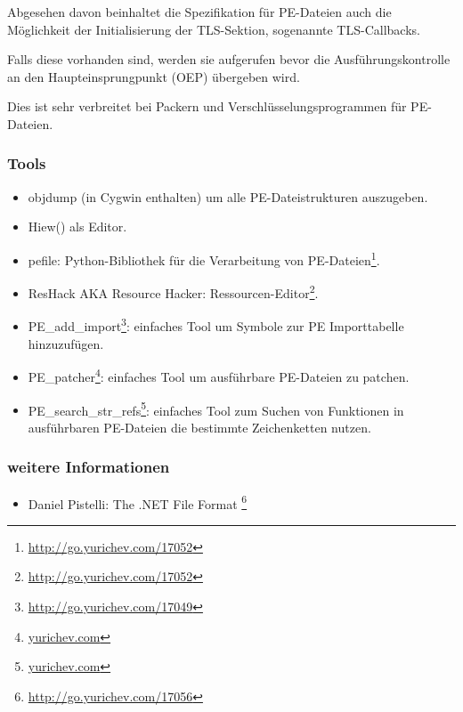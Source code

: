 Abgesehen davon beinhaltet die Spezifikation für PE-Dateien auch die Möglichkeit
der Initialisierung der \ac{TLS}-Sektion, sogenannte TLS-Callbacks.

Falls diese vorhanden sind, werden sie aufgerufen bevor die Ausführungskontrolle
an den Haupteinsprungpunkt (\ac{OEP}) übergeben wird.

Dies ist sehr verbreitet bei Packern und Verschlüsselungsprogrammen für PE-Dateien.

\subsubsection{Tools}

\label{ResHack}

\begin{itemize}
\item objdump (in Cygwin enthalten) um alle PE-Dateistrukturen auszugeben.

\item Hiew() als Editor.

\item pefile: Python-Bibliothek für die Verarbeitung von PE-Dateien\footnote{\url{http://go.yurichev.com/17052}}.

\item ResHack \acs{AKA} Resource Hacker: Ressourcen-Editor\footnote{\url{http://go.yurichev.com/17052}}.

\item PE\_add\_import\footnote{\url{http://go.yurichev.com/17049}}: einfaches Tool
um Symbole zur PE Importtabelle hinzuzufügen.

\item PE\_patcher\footnote{\href{http://go.yurichev.com/17054}{yurichev.com}}:
einfaches Tool um ausführbare PE-Dateien zu patchen.

\item PE\_search\_str\_refs\footnote{\href{http://go.yurichev.com/17055}{yurichev.com}}:
einfaches Tool zum Suchen von Funktionen in ausführbaren PE-Dateien die bestimmte
Zeichenketten nutzen.
\end{itemize}

\subsubsection{weitere Informationen}

\begin{itemize}
\item Daniel Pistelli: The .NET File Format \footnote{\url{http://go.yurichev.com/17056}}
\end{itemize}
